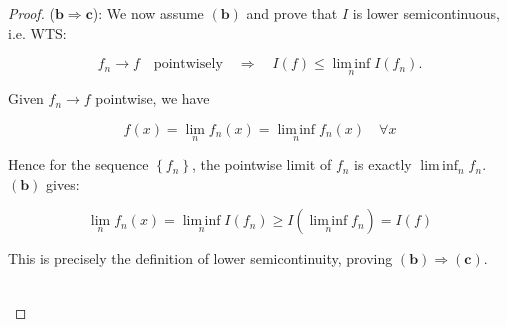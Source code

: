 \begin{proof}

(\(\mathbf{b}\Longrightarrow\mathbf{c}\)): We now assume \((\mathbf{b})\) and prove that \(I\) is lower semicontinuous, i.e. WTS:

\[f_{n}\rightarrow f\quad\text{pointwisely}\quad\Rightarrow\quad I(f) \leq \operatorname{lim\, inf}\limits_{n}I(f_{n}).\]

Given \(f_{n}\rightarrow f\) pointwise, we have

\[f(x) = \lim\limits_{n}f_{n}(x) = \operatorname{lim\, inf}\limits_{n}f_{n}(x)\quad\forall x\]

Hence for the sequence \(\left\{ f_{n} \right\}\), the pointwise limit of \(f_{n}\) is exactly \(\operatorname{lim\, inf}_{n}f_{n}\). \((\mathbf{b})\) gives:

\[\lim\limits_{n}f_{n}(x) = \operatorname{lim\, inf}\limits_{n}I(f_{n}) \geq I(\operatorname{lim\, inf}\limits_{n}f_{n}) = I(f)\]

This is precisely the definition of lower semicontinuity, proving \((\mathbf{b})\Longrightarrow(\mathbf{c})\).\\
\strut \\

\end{proof}

